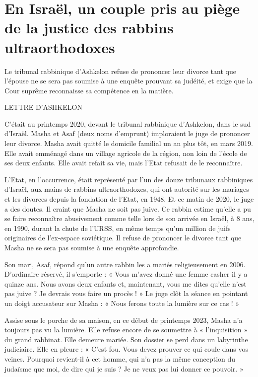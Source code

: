 \section{En Israël, un couple pris au piège de la justice des rabbins ultraorthodoxes}



Le tribunal rabbinique d’Ashkelon refuse de prononcer leur divorce tant que l’épouse ne se sera pas soumise à une enquête prouvant sa judéité, et exige que la Cour suprême reconnaisse sa compétence en la matière.

LETTRE D’ASHKELON

C’était au printemps 2020, devant le tribunal rabbinique d’Ashkelon, dans le sud d’Israël. Masha et Asaf (deux noms d’emprunt) imploraient le juge de prononcer leur divorce. Masha avait quitté le domicile familial un an plus tôt, en mars 2019. Elle avait emménagé dans un village agricole de la région, non loin de l’école de ses deux enfants. Elle avait refait sa vie, mais l’Etat refusait de le reconnaître.

L’Etat, en l’occurrence, était représenté par l’un des douze tribunaux rabbiniques d’Israël, aux mains de rabbins ultraorthodoxes, qui ont autorité sur les mariages et les divorces depuis la fondation de l’Etat, en 1948. Et ce matin de 2020, le juge a des doutes. Il craint que Masha ne soit pas juive. Ce rabbin estime qu’elle a pu se faire reconnaître abusivement comme telle lors de son arrivée en Israël, à 8 ans, en 1990, durant la chute de l’URSS, en même temps qu’un million de juifs originaires de l’ex-espace soviétique. Il refuse de prononcer le divorce tant que Masha ne se sera pas soumise à une enquête approfondie.

Son mari, Asaf, répond qu’un autre rabbin les a mariés religieusement en 2006. D’ordinaire réservé, il s’emporte : « Vous m’avez donné une femme casher il y a quinze ans. Nous avons deux enfants et, maintenant, vous me dites qu’elle n’est pas juive ? Je devrais vous faire un procès ! » Le juge clôt la séance en pointant un doigt accusateur sur Masha : « Nous ferons toute la lumière sur ce cas ! »

Assise sous le porche de sa maison, en ce début de printemps 2023, Masha n’a toujours pas vu la lumière. Elle refuse encore de se soumettre à « l’inquisition » du grand rabbinat. Elle demeure mariée. Son dossier se perd dans un labyrinthe judiciaire. Elle en pleure : « C’est fou. Vous devez prouver ce qui coule dans vos veines. Pourquoi revient-il à cet homme, qui n’a pas la même conception du judaïsme que moi, de dire qui je suis ? Je ne veux pas lui donner ce pouvoir. »

